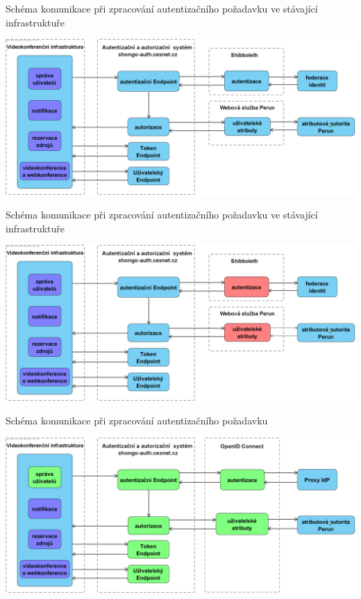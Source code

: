 \documentclass[
]{beamer}
\begin{document}
\begin{frame}{Schéma komunikace při zpracování autentizačního požadavku ve stávající infrastruktuře}

\includegraphics[width=\textwidth]{pics/meetings-old.png}
\end{frame}

\begin{frame}{Schéma komunikace při zpracování autentizačního požadavku ve stávající infrastruktuře}

\includegraphics[width=\textwidth]{pics/meetongs-old-crash.png}
\end{frame}

\begin{frame}{Schéma komunikace při zpracování autentizačního požadavku}

\includegraphics[width=\textwidth]{pics/oidc-new.png}
\end{frame}
\end{document}
